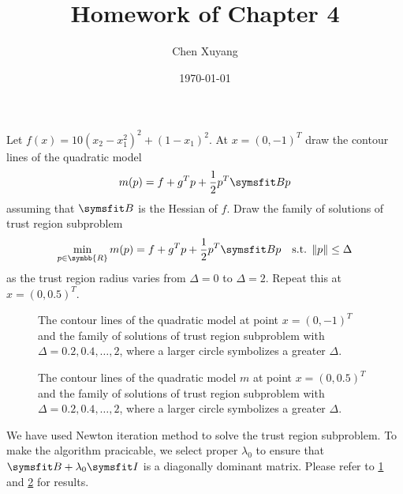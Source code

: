 \documentclass{assignment}[2019/10/15]
\title{Homework of Chapter 4}
\author{Chen Xuyang}
\date{\today}
\institute{School of Mathematical Science}
\newcommand{\BR}{\symbb{R}}
\newcommand{\B}{\matr{B}}
\begin{document}
    \maketitle
    \begin{problem}\label{prob:1}
        Let $f(x)=10\left(x_2-x_1^2\right)^2+(1-x_1)^2$. At $x=(0, -1)^T$ draw the contour lines of the quadratic model
        \begin{equation}
            m(p)=f+g^Tp+\frac{1}{2}p^T\B p
        \end{equation}
        assuming that $\B$ is the Hessian of $f$. Draw the family of solutions of trust region subproblem
        \begin{equation}
            \min_{p\in\BR}m(p)=f+g^Tp+\frac{1}{2}p^T\B p\quad\text{s.t. }\norm{p}\leq\Delta
        \end{equation}
        as the trust region radius varies from $\Delta=0$ to $\Delta=2$. Repeat this at $x=(0, 0.5)^T$.
    \end{problem}
    \begin{solution}
        \begin{figure}[htb]
            \centering
            
            \caption{The contour lines of the quadratic model at point $x = (0, -1)^T$ and the family of solutions of trust region subproblem with $\Delta=0.2, 0.4, \dotsc, 2$, where a larger circle symbolizes a greater $\Delta$.}
            \label{fig:1}
        \end{figure}
        \begin{figure}[htb]
            \centering
            
            \caption{The contour lines of the quadratic model $m$ at point $x = (0, 0.5)^T$ and the family of solutions of trust region subproblem with $\Delta=0.2, 0.4, \dotsc, 2$, where a larger circle symbolizes a greater $\Delta$.}
            \label{fig:2}
        \end{figure}
        We have used Newton iteration method to solve the trust region subproblem. To make the algorithm pracicable, we select proper $\lambda_0$ to ensure that $\B +\lambda_0 \matr{I}$ is a diagonally dominant matrix.
        Please refer to \ref{fig:1} and \ref{fig:2} for results.
    \end{solution}
\end{document}
